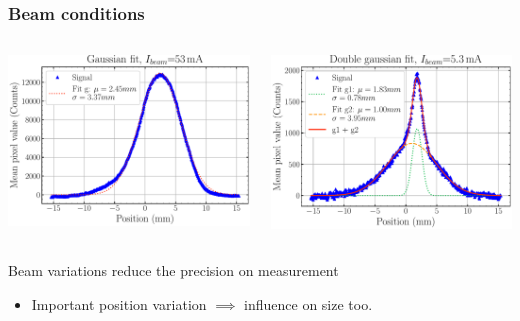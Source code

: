 \begin{frame}[t]
  \frametitle{Beam conditions}
  \begin{columns}[T]
    \begin{column}{0.45\textwidth}
      \includegraphics[width=1\textwidth]{04_Test/fig/fig000_ex_beam_profile_a3}
    \end{column}
    \begin{column}{0.45\textwidth}
      \includegraphics[width=1\textwidth]{04_Test/fig/fig000_ex_beam_profile_b3}
    \end{column}
  \end{columns}
  \begin{block}{Beam variations reduce the precision on measurement}
    \begin{itemize}
      \item Important position variation $\implies$ influence on size too.

\end{itemize}
\end{block}
\end{frame}
